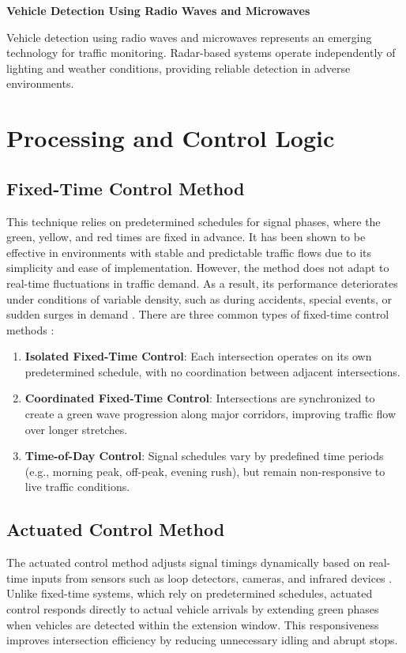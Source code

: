 \documentclass[11pt, a4paper]{report}
\begin{document}
\textbf{Vehicle Detection Using Radio Waves and Microwaves}

Vehicle detection using radio waves and microwaves represents an emerging technology for traffic monitoring. Radar-based systems operate independently of lighting and weather conditions, providing reliable detection in adverse environments.

\section{Processing and Control Logic}

\subsection{Fixed-Time Control Method}

This technique relies on predetermined schedules for signal phases, where the green, yellow, and red times are fixed in advance. It has been shown to be effective in environments with stable and predictable traffic flows due to its simplicity and ease of implementation. However, the method does not adapt to real-time fluctuations in traffic demand. As a result, its performance deteriorates under conditions of variable density, such as during accidents, special events, or sudden surges in demand \cite{michailidis2025traffic}. There are three common types of fixed-time control methods \cite{tang2019global}:

\begin{enumerate}
    \item \textbf{Isolated Fixed-Time Control}: Each intersection operates on its own predetermined schedule, with no coordination between adjacent intersections.
    \item \textbf{Coordinated Fixed-Time Control}: Intersections are synchronized to create a green wave progression along major corridors, improving traffic flow over longer stretches.
    \item \textbf{Time-of-Day Control}: Signal schedules vary by predefined time periods (e.g., morning peak, off-peak, evening rush), but remain non-responsive to live traffic conditions.
\end{enumerate}

\subsection{Actuated Control Method}

The actuated control method adjusts signal timings dynamically based on real-time inputs from sensors such as loop detectors, cameras, and infrared devices \cite{kalavsova2022impact}. Unlike fixed-time systems, which rely on predetermined schedules, actuated control responds directly to actual vehicle arrivals by extending green phases when vehicles are detected within the extension window. This responsiveness improves intersection efficiency by reducing unnecessary idling and abrupt stops.
\end{document}
